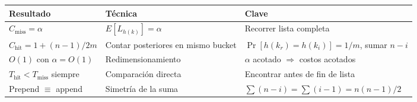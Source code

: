 \documentclass[11pt, letterpaper]{article}
\theoremstyle{definition}
\theoremstyle{plain}
\theoremstyle{remark}
\begin{document}
\begin{table}[h]
\centering
\begin{tabular}{llp{5.5cm}}
\toprule
\textbf{Resultado} & \textbf{Técnica} & \textbf{Clave} \\
\midrule
$C_{\text{miss}} = \alpha$
  & $E[L_{h(k)}] = \alpha$
  & Recorrer lista completa \\
$C_{\text{hit}} = 1 + (n{-}1)/2m$
  & Contar posteriores en mismo bucket
  & $\Pr[h(k_r){=}h(k_i)] = 1/m$, sumar $n{-}i$ \\
$O(1)$ con $\alpha = O(1)$
  & Redimensionamiento
  & $\alpha$ acotado $\Rightarrow$ costos acotados \\
$T_{\text{hit}} < T_{\text{miss}}$ siempre
  & Comparación directa
  & Encontrar antes de fin de lista \\
Prepend $\equiv$ append
  & Simetría de la suma
  & $\sum(n{-}i) = \sum(i{-}1) = n(n{-}1)/2$ \\
\bottomrule
\end{tabular}
\end{table}
\end{document}

